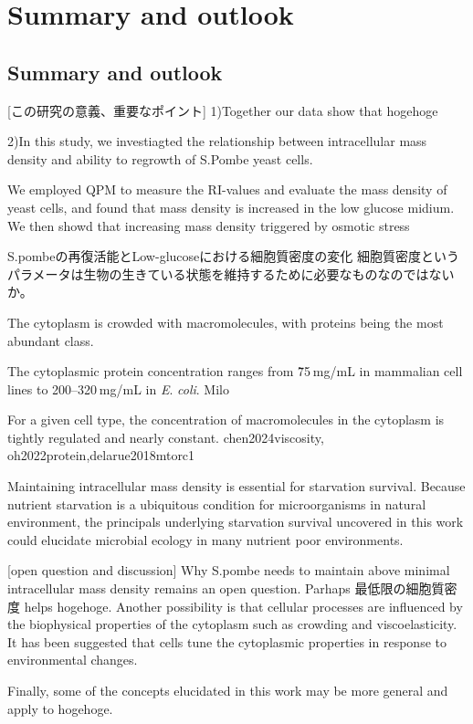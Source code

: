 \chapter{Summary and outlook}
\section{Summary and outlook}
[この研究の意義、重要なポイント]
1)Together our data show that hogehoge

2)In this study, we investiagted the relationship between intracellular mass density and ability to regrowth of S.Pombe yeast cells.

We employed QPM to measure the RI-values and evaluate the mass density of yeast cells, and found that mass density is increased in the low glucose midium. We then showd that increasing mass density triggered by osmotic stress 


S.pombeの再復活能とLow-glucoseにおける細胞質密度の変化
細胞質密度というパラメータは生物の生きている状態を維持するために必要なものなのではないか。

The cytoplasm is crowded with macromolecules, with proteins being the most abundant class. 

The cytoplasmic protein concentration ranges from \~75 mg/mL in mammalian cell lines to 200–320 mg/mL in \textit{E}. \textit{coli}. Milo

For a given cell type, the concentration of macromolecules in the cytoplasm is tightly regulated and nearly constant. chen2024viscosity, oh2022protein,delarue2018mtorc1

Maintaining intracellular mass density is essential for starvation survival. Because nutrient starvation is a ubiquitous condition for microorganisms in natural environment, the principals underlying starvation survival uncovered in this work could elucidate microbial ecology in many nutrient poor environments. 

[open question and discussion]
Why S.pombe needs to maintain above minimal intracellular mass density remains an open question. 
Parhaps 最低限の細胞質密度 helps hogehoge.
Another possibility is that cellular processes are influenced by the biophysical properties of the cytoplasm such as crowding and viscoelasticity. It has been suggested that cells tune the cytoplasmic properties in response to environmental changes.

Finally, some of the concepts elucidated in this work may be more general and apply to hogehoge.

